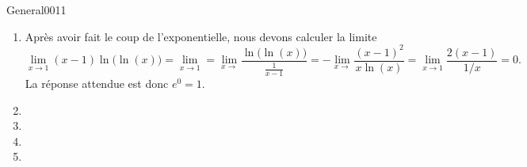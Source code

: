 \begin{corrige}{General0011}
\begin{enumerate}
\item
Après avoir fait le coup de l'exponentielle, nous devons calculer la limite
\begin{equation}
	\lim_{x\to 1} (x-1)\ln\big( \ln(x) \big)=\lim_{x\to 1} =\lim_{x\to } \frac{ \ln\big( \ln(x) \big) }{ \frac{1}{ x-1 } }=-\lim_{x\to } \frac{ (x-1)^2 }{ x\ln(x) }=\lim_{x\to 1} \frac{ 2(x-1) }{ 1/x }=0.
\end{equation}
La réponse attendue est donc $ e^{0}=1$.

\item
\item
\item
\item


\end{enumerate}

\end{corrige}
